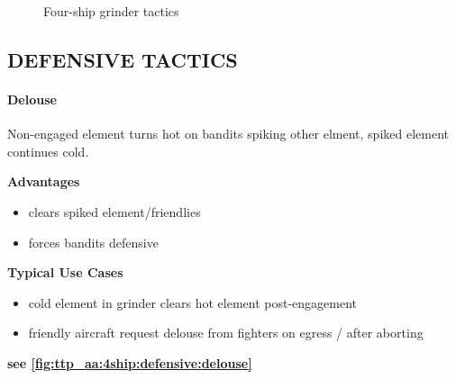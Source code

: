 \begin{figure}[htbp]
    \caption{Four-ship grinder tactics}%
    \label{fig:ttp_aa:4ship:offensive:grinder}
\end{figure}

\clearpage

\subsection{DEFENSIVE TACTICS}

\paragraph{Delouse} 
Non-engaged element turns hot on bandits spiking other elment,
spiked element continues cold.

\bigskip
\textbf{Advantages}
\begin{itemize}
    \item clears spiked element/friendlies
    \item forces bandits defensive
\end{itemize}

\textbf{Typical Use Cases}
\begin{itemize}
    \item cold element in grinder clears hot element post-engagement
    \item friendly aircraft request delouse from fighters on egress / after aborting
\end{itemize}

\hfill\textbf{see \cref{fig:ttp_aa:4ship:defensive:delouse}}


